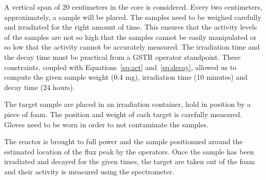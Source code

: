 A vertical span of 20 centimeters in the core is considered. Every two centimeters, approximately, a sample will be placed. The samples need to be weighed carefully and irradiated for the right amount of time. This ensures that the activity levels of the samples are not so high that the samples cannot be easily manipulated or so low that the activity cannot be accurately measured. The irradiation time and the decay time must be practical from a GSTR operator standpoint. These constraints, coupled with Equations~\ref{eq:act} and~\ref{eq:decay}, allowed us to compute the given sample weight (0.4 mg), irradiation time (10 minutes) and decay time (24 hours).

The target sample are placed in an irradiation container, hold in position by a piece of foam. The position and weight of each target is carefully measured. Gloves need to be worn in order to not contaminate the samples.

The reactor is brought to full power and the sample positionned around the estimated location of the flux peak by the operators. Once the sample has been irradiated and decayed for the given times, the target are taken out of the foam and their activity is measured using the spectrometer.

